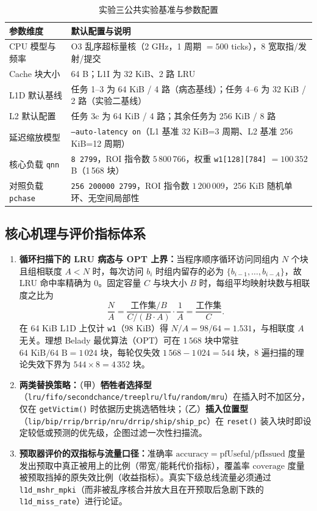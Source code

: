 \documentclass[12pt,a4paper,fontset=mac]{ctexart}
\begin{document}
\begin{table}[H]\centering\footnotesize\setlength{\tabcolsep}{4.5pt}
\caption{实验三公共实验基准与参数配置}\label{tab:env}
\begin{tabular}{lp{10.5cm}}\toprule
参数维度 & 默认配置与说明 \\\midrule
CPU 模型与频率 & O3 乱序超标量核（2 GHz，1 周期 $= 500$ ticks），8 宽取指/发射/提交 \\
Cache 块大小 & 64 B；L1I 为 32 KiB、2 路 LRU \\
L1D 默认基线 & 任务 1--3 为 64 KiB / 4 路（病态基线）；任务 4--6 为 32 KiB / 2 路（实验二基线） \\
L2 默认配置 & 任务 3c 为 64 KiB / 4 路；其余任务为 256 KiB / 8 路 \\
延迟缩放模型 & \texttt{--auto-latency on}（L1 基准 32 KiB=3 周期、L2 基准 256 KiB=12 周期） \\
核心负载 \texttt{qnn} & \texttt{8 2799}，ROI 指令数 $5\,800\,766$，权重 \texttt{w1[128][784]} $= 100\,352$ B（1\,568 块） \\
对照负载 \texttt{pchase} & \texttt{256 200000 2799}，ROI 指令数 $1\,200\,009$，256 KiB 随机单环、无空间局部性 \\
\bottomrule\end{tabular}
\end{table}

\subsection{核心机理与评价指标体系}
\begin{enumerate}
  \item \textbf{循环扫描下的 LRU 病态与 OPT 上界：}当程序顺序循环访问同组内 $N$ 个块且组相联度 $A < N$ 时，每次访问 $b_i$ 时组内留存的必为 $\{b_{i-1},\dots,b_{i-A}\}$，故 LRU 命中率精确为 $0$。固定容量 $C$ 与块大小 $B$ 时，每组平均映射块数与相联度之比为
  \begin{equation}
  \frac{N}{A} = \frac{\text{工作集}/B}{C/(B\cdot A)} \cdot \frac{1}{A} = \frac{\text{工作集}}{C}.
  \end{equation}
  在 64 KiB L1D 上仅计 \texttt{w1}（98 KiB）得 $N/A = 98/64 = 1.531$，与相联度 $A$ 无关。理想 Belady 最优算法（OPT）可在 $1\,568$ 块中常驻 $64\text{ KiB}/64\text{ B} = 1\,024$ 块，每轮仅失效 $1\,568 - 1\,024 = 544$ 块，8 遍扫描的理论失效下界为 $544 \times 8 = 4\,352$ 块。
  \item \textbf{两类替换策略：}（甲）\textbf{牺牲者选择型}（\texttt{lru/fifo/secondchance/treeplru/lfu/random/mru}）在插入时不加区分，仅在 \texttt{getVictim()} 时依据历史挑选牺牲块；（乙）\textbf{插入位置型}（\texttt{lip/bip/rrip/brrip/nru/drrip/ship/ship\_pc}）在 \texttt{reset()} 装入块时即设定较低或预测的优先级，企图过滤一次性扫描流。
  \item \textbf{预取器评价的双指标与流量口径：}准确率 $\mathrm{accuracy} = \mathrm{pfUseful}/\mathrm{pfIssued}$ 度量发出预取中真正被用上的比例（带宽/能耗代价指标），覆盖率 $\mathrm{coverage}$ 度量被预取挡掉的原失效比例（收益指标）。真实下级总线流量必须通过 \texttt{l1d\_mshr\_mpki}（而非被乱序核合并放大且在开预取后急剧下跌的 \texttt{l1d\_miss\_rate}）进行论证。
\end{enumerate}
\end{document}
